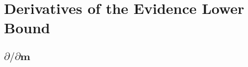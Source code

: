 \documentclass{article}
\theoremstyle{definition}
\begin{document}

\section{Derivatives of the Evidence Lower Bound}

\subsection{$\partial/\partial\mathbf{m}$}
\end{document}
